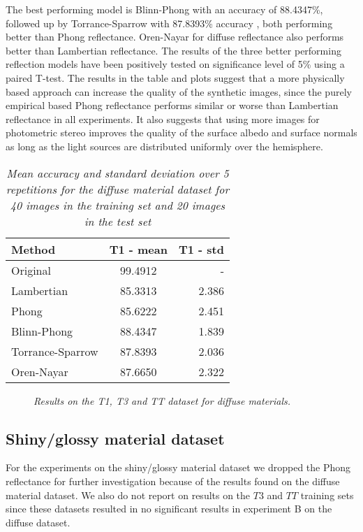 The best performing model is Blinn-Phong with an accuracy of 88.4347\%, followed up by Torrance-Sparrow with 87.8393\% accuracy , both performing better than Phong reflectance. Oren-Nayar for diffuse reflectance also performs better than Lambertian reflectance. The results of the three better performing reflection models have been positively tested on significance level of 5\% using a paired T-test. The results in the table and plots suggest that a more physically based approach can increase the quality of the synthetic images, since the purely empirical based Phong reflectance performs similar or worse than Lambertian reflectance in all experiments. It also suggests that using more images for photometric stereo improves the quality of the surface albedo and surface normals as long as the light sources are distributed uniformly over the hemisphere.

\begin{table}
	\center
	\begin{tabular}{l|c|r}
	Method 				&	T1 - mean 	& T1 - std \\
	\hline
	Original			&	99.4912		& - \\
	Lambertian 			&	85.3313		& 2.386 \\
	Phong 				&	85.6222		& 2.451 \\
	Blinn-Phong 		& 	88.4347 	& 1.839 \\
	Torrance-Sparrow 	&	87.8393 	& 2.036 \\
	Oren-Nayar 			&	87.6650 	& 2.322 \\
	\end{tabular}
	\caption{{\it Mean accuracy and standard deviation over 5 repetitions for the diffuse material dataset for 40 images in the training set and 20 images in the test set}}
	\label{tab:DiffuseResultsB}
\end{table}

\begin{figure}[H]
	\begin{center}
	\end{center}
	\caption{{\it Results on the T1, T3 and TT dataset for diffuse materials.}}
	\label{fig:DiffusePlotB}
\end{figure}

\subsection{Shiny/glossy material dataset}
For the experiments on the shiny/glossy material dataset we dropped the Phong reflectance for further investigation because of the results found on the diffuse material dataset. We also do not report on results on the $T3$ and $TT$ training sets since these datasets resulted in no significant results in experiment B on the diffuse dataset.

